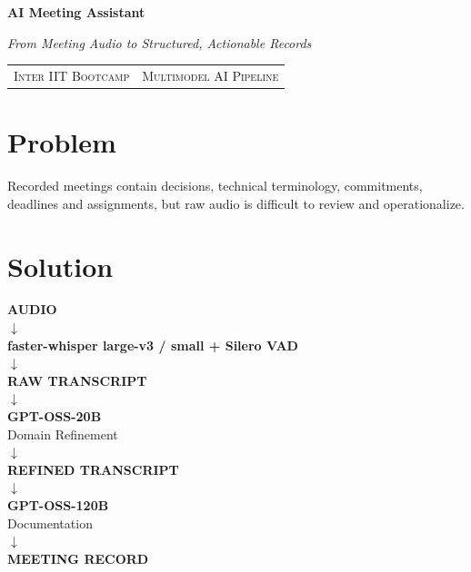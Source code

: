 \documentclass[9pt,a4paper]{extarticle}
\newcommand{\tagline}[1]{{\large\color{charcoal}\itshape #1\par}}
\newcommand{\smallcaps}[1]{\textsc{#1}}
\begin{document}
\thispagestyle{fancy}
{\fontsize{25}{28}\selectfont\bfseries AI Meeting Assistant\par}
\vspace{1pt}
\tagline{From Meeting Audio to Structured, Actionable Records}
\vspace{3pt}
\begin{tabularx}{\textwidth}{@{}X r@{}}
\smallcaps{Inter IIT Bootcamp} & \smallcaps{Multimodel AI Pipeline}
\end{tabularx}
\vspace{3pt}

\begin{minipage}[t]{0.34\textwidth}
\section*{Problem}
Recorded meetings contain decisions, technical terminology, commitments, deadlines and assignments, but raw audio is difficult to review and operationalize.

\section*{Solution}
\begin{card}
\centering
\textbf{AUDIO}\\[-1pt] $\downarrow$\\[-2pt]
\textbf{faster-whisper large-v3 / small + Silero VAD}\\[-1pt] $\downarrow$\\[-2pt]
\textbf{RAW TRANSCRIPT}\\[-1pt] $\downarrow$\\[-2pt]
\textbf{GPT-OSS-20B}\\[-1pt]{\scriptsize Domain Refinement}\\[-2pt]$\downarrow$\\[-2pt]
\textbf{REFINED TRANSCRIPT}\\[-1pt] $\downarrow$\\[-2pt]
\textbf{GPT-OSS-120B}\\[-1pt]{\scriptsize Documentation}\\[-2pt]$\downarrow$\\[-2pt]
\textbf{MEETING RECORD}
\end{card}
\end{minipage}\hfill
\end{document}
